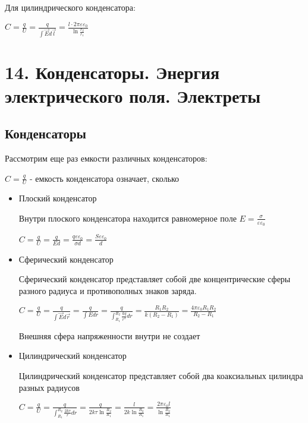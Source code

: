 \documentclass[12pt]{article}
\begin{document}
Для цилиндрического конденсатора:

$C = \frac{q}{U} = \frac{q}{\int \vec{E}d\vec{l}} = \frac{l \cdot 2\pi \varepsilon \varepsilon_0}{\ln \frac{r_2}{r_1}}$









\section{14. Конденсаторы. Энергия электрического поля. Электреты}

\subsection{Конденсаторы}

Рассмотрим еще раз емкости различных конденсаторов:

$C = \frac{q}{U}$ - емкость конденсатора означает, сколько 

\begin{itemize}
    \item Плоский конденсатор

    Внутри плоского конденсатора находится равномерное поле $E = \frac{\sigma}{\varepsilon\varepsilon_0}$

    $C = \frac{q}{U} = \frac{q}{Ed} = \frac{q \varepsilon \varepsilon_0}{\sigma d} = \frac{S \varepsilon \varepsilon_0}{d}$

    \item Сферический конденсатор

    Сферический конденсатор представляет собой две концентрические сферы разного радиуса и противополных знаков заряда.

    $C = \frac{q}{U} = \frac{q}{\int \vec{E}d\vec{r}} = \frac{q}{\int Edr} = \frac{q}{\int_{R_1}^{R_2} \frac{kq}{r^2} dr} = \frac{R_1 R_2}{k(R_2 - R_1)} = \frac{4\pi \varepsilon_0 R_1 R_2}{R_2 - R_1}$

    Внешняя сфера напряженности внутри не создает

    \item Цилиндрический конденсатор

    Цилиндрический конденсатор представляет собой два коаксиальных цилиндра разных радиусов

    $C = \frac{q}{U} = \frac{q}{\int_{R_1}^{R_2} \frac{2k\tau}{r} dr} = \frac{q}{2k\tau \ln\frac{R_2}{R_1}} = \frac{l}{2k\ln\frac{R_2}{R_1}} = \frac{2\pi \varepsilon_0 l}{\ln \frac{R_2}{R_1}}$

\end{itemize}
\end{document}
